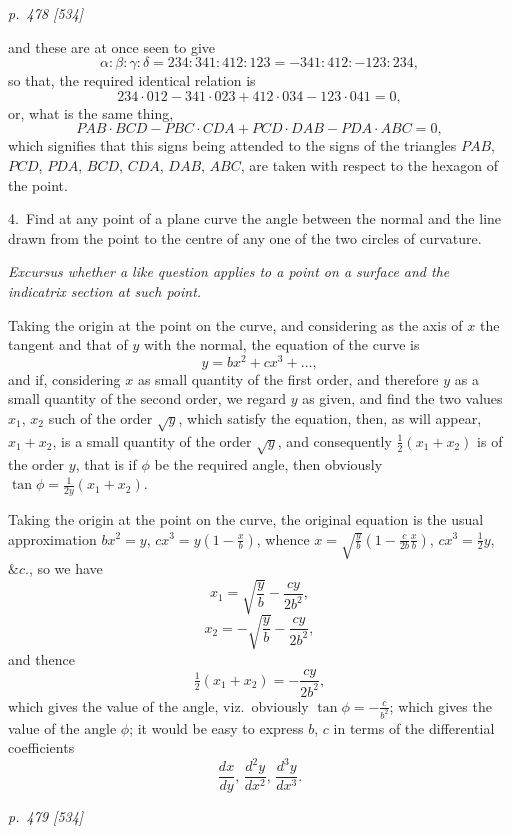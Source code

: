 \documentclass[11pt,a4paper]{book}
\begin{document}
\clearpage

\bigskip
\textit{p.~478 [534]}
\smallskip

\noindent
and these are at once seen to give
\[
\alpha : \beta : \gamma : \delta = 234 : 341 : 412 : 123 = -341 : 412 : -123 : 234,
\]
so that, the required identical relation is
\[
234\cdot 012 - 341\cdot 023 + 412\cdot 034 - 123\cdot 041 = 0,
\]
or, what is the same thing,
\[
PAB\cdot BCD - PBC\cdot CDA + PCD\cdot DAB - PDA\cdot ABC = 0,
\]
which signifies that this signs being attended to the signs of the triangles $PAB$, $PCD$, $PDA$, $BCD$, $CDA$, $DAB$, $ABC$, are taken with respect to the
hexagon of the point.

\smallskip
\noindent\textsc{4.}\, Find at any point of a plane curve the angle between the normal and the line
drawn from the point to the centre of any one of the two circles of curvature.

\textit{Excursus whether a like question applies to a point on a surface and the indicatrix
section at such point.}

Taking the origin at the point on the curve, and considering as the axis of $x$ the
tangent and that of $y$ with the normal, the equation of the curve is
\[
y = bx^2 + cx^3 + \ldots,
\]
and if, considering $x$ as small quantity of the first order, and therefore $y$ as a small
quantity of the second order, we regard $y$ as given, and find the two values $x_1$, $x_2$
such of the order $\sqrt{y}$, which satisfy the equation, then, as will appear, $x_1 + x_2$, is a
small quantity of the order $\sqrt{y}$, and consequently $\frac{1}{2}(x_1 + x_2)$ is of the order $y$, that
is if $\phi$ be the required angle, then obviously $\tan\phi = \frac{1}{2y}(x_1 + x_2)$.

Taking the origin at the point on the curve, the original equation is the usual
approximation $bx^2 = y$, $cx^3 = y\left(1 - \frac{x}{b}\right)$, whence $x = \sqrt{\frac{y}{b}}\left(1 - \frac{c}{2b}\frac{x}{b}\right)$, $cx^3 = \frac{1}{2}y$, $\&c.$, so
we have
\[
x_1 = \sqrt{\frac{y}{b}} - \frac{c y}{2b^2},
\]
\[
x_2 = -\sqrt{\frac{y}{b}} - \frac{c y}{2b^2},
\]
and thence
\[
\tfrac{1}{2}(x_1 + x_2) = -\frac{cy}{2b^2},
\]
which gives the value of the angle, viz.\ obviously $\tan\phi = -\frac{c}{b^2}$;
which gives the value of the angle $\phi$; it would be easy to express $b$, $c$ in terms of
the differential coefficients
\[
\frac{dx}{dy},\,\frac{d^2y}{dx^2},\,\frac{d^3y}{dx^3}.
\]

\clearpage

\bigskip
\textit{p.~479 [534]}
\smallskip
\end{document}
